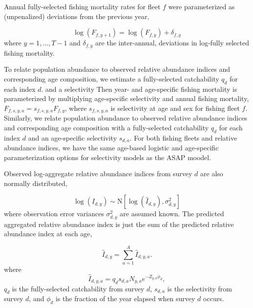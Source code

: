 \documentclass[12pt,letterpaper, leqno]{article}
\begin{document}
Annual fully-selected fishing mortality rates for fleet $f$ were parameterized as (unpenalized) deviations from the previous year,

\vspace{-12pt}
\begin{equation*}
 \log\left(F_{f,y+1}\right) = \log\left(F_{f,y}\right) + \delta_{f,y}
\end{equation*}
where $y=1,\ldots,T-1$ and $\delta_{f,y}$ are the inter-annual, deviations in log-fully selected fishing mortality. 

To relate population abundance to observed relative abundance indices and corresponding age composition, we estimate a fully-selected catchability $q_{d}$ for each index $d$. and a selectivity
Then year- and age-specific fishing mortality is parameterized by multiplying age-specific selectivity and annual fishing mortality, $ F_{f,s,y,a} = s_{f,s,y,a} F_{f,y}$, where $s_{f,s,y,a}$ is selectivity at age and sex for fishing fleet $f$. Similarly, we relate population abundance to observed relative abundance indices and corresponding age composition with a fully-selected catchability $q_{d}$ for each index $d$ and an age-specific selectivity $s_{d,a}$. For both fishing fleets and relative abundance indices, we have the same age-based logistic and age-specific parameterization options for selectivity models as the ASAP moodel.

Observed log-aggregate relative abundance indices from survey $d$ are also normally distributed,

\vspace{-12pt}
\begin{equation*}
 \log\left(I_{d,y}\right) \sim \text{N}\left[\log\left(\widehat I_{d,y}\right), \sigma^2_{d,y}\right]
\end{equation*}
where observation error variances $\sigma^2_{d,y}$ are assumed known. The predicted aggregated relative abundance index is just the sum of the predicted relative abundance index at each age,

\vspace{-12pt}
\begin{equation*}
\widehat I_{d,y} = \sum^A_{a=1} \widehat I_{d,y,a}.
\end{equation*}
where
\vspace{-12pt}
\begin{equation*}
\widehat I_{d,y,a} = q_d s_{d,a} N_{y,a} e^{- Z_{y,a} \phi_d}, 
\end{equation*}
$q_d$ is the fully-selected catchability from survey $d$, $s_{d,a}$ is the selectivity from survey $d$, and $\phi_d$ is the fraction of the year elapsed when survey $d$ occurs. 
\end{document}
